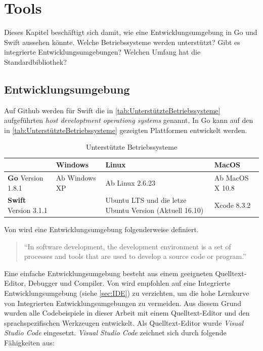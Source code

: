 \chapter{Tools}
Dieses Kapitel beschäftigt sich damit, wie eine Entwicklungsumgebung in Go und Swift aussehen könnte. 
Welche Betriebssysteme werden unterstützt?
Gibt es integrierte Entwicklungsumgebungen?
Welchen Umfang hat die Standardbibliothek?


\section{Entwicklungsumgebung}
Auf Github \cite[]{Github.Swift} werden für Swift die in \autoref{tab:UnterstützteBetriebssysteme} aufgeführten \textit{host developtment operationg systems} genannt.
In Go kann auf den in \autoref{tab:UnterstützteBetriebssysteme} gezeigten Plattformen entwickelt werden.

\begin{table}[H]
    \centering
    \begin{tabularx}{\textwidth}{ |X|X|X|X| }
    \hline 
    \rowcolor[gray]{0.75} \cellcolor{white} & \textbf{Windows} & \textbf{Linux} & \textbf{MacOS} \\
    \hline
    \cellcolor{Gray} \textbf{Go} Version 1.8.1 & Ab Windows XP & Ab Linux 2.6.23 & Ab MacOS X 10.8 \\
    \hline
    \cellcolor{Gray} \textbf{Swift} Version 3.1.1 &  & Ubuntu LTS und die letze Ubuntu Version (Aktuell 16.10) & Xcode 8.3.2 \\
    \hline
    \end{tabularx}
    \caption{Unterstützte Betriebssysteme}
    \label{tab:UnterstützteBetriebssysteme}
\end{table}

Von \cite[]{TechnoPedia} wird eine Entwicklungsumgebung folgenderweise definiert.

\begin{quote}
\enquote{In software development, the development environment is a set of processes and tools that are used to develop a source code or program.}\cite[]{TechnoPedia}
\end{quote}

Eine einfache Entwicklungsumgebung besteht aus einem geeigneten Quelltext-Editor, Debugger und Compiler. Von \cite[]{NotUseIde} wird empfohlen auf eine Integrierte Entwicklungsumgebung (siehe \autoref{sec:IDE}) zu verzichten, um die hohe Lernkurve von Integrierten Entwicklungsumgebungen zu vermeiden.
Aus diesem Grund wurden alle Codebeispiele in dieser Arbeit mit einem Quelltext-Editor und den sprachspezifischen Werkzeugen entwickelt.
Als Quelltext-Editor wurde \textit{Visual Studio Code} eingesetzt. 
\textit{Visual Studio Code} zeichnet sich durch folgende Fähigkeiten aus:

